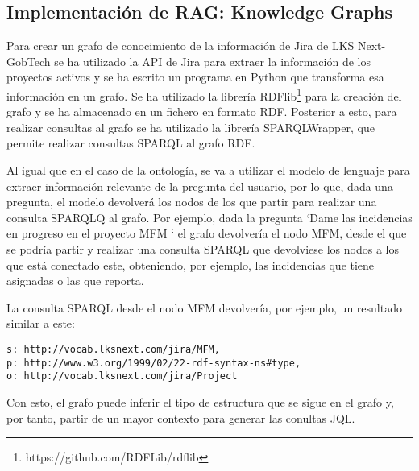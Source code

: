 \subsection{Implementación de RAG: Knowledge Graphs}
 Para crear un grafo de conocimiento de la información de Jira de LKS Next-GobTech se ha utilizado la API de Jira para extraer la información de los proyectos activos y se ha escrito un programa en Python que transforma esa información en un grafo. Se ha utilizado la librería RDFlib\footnote{https://github.com/RDFLib/rdflib} para la creación del grafo y se ha almacenado en un fichero en formato RDF. Posterior a esto, para realizar consultas al grafo se ha utilizado la librería SPARQLWrapper, que permite realizar consultas SPARQL al grafo RDF.

Al igual que en el caso de la ontología, se va a utilizar el modelo de lenguaje para extraer información relevante de la pregunta del usuario, por lo que, dada una pregunta, el modelo devolverá los nodos de los que partir para realizar una consulta SPARQLQ al grafo. Por ejemplo, dada la pregunta `Dame las incidencias en progreso en el proyecto MFM ` el grafo devolvería el nodo MFM, desde el que se podría partir y realizar una consulta SPARQL que devolviese los nodos a los que está conectado este, obteniendo, por ejemplo, las incidencias que tiene asignadas o las que reporta.

La consulta SPARQL desde el nodo MFM devolvería, por ejemplo, un resultado similar a este:
\begin{small}
\begin{verbatim}
s: http://vocab.lksnext.com/jira/MFM, 
p: http://www.w3.org/1999/02/22-rdf-syntax-ns#type, 
o: http://vocab.lksnext.com/jira/Project
\end{verbatim}
\end{small}

Con esto, el grafo puede inferir el tipo de estructura que se sigue en el grafo y, por tanto, partir de un mayor contexto para generar las conultas JQL.